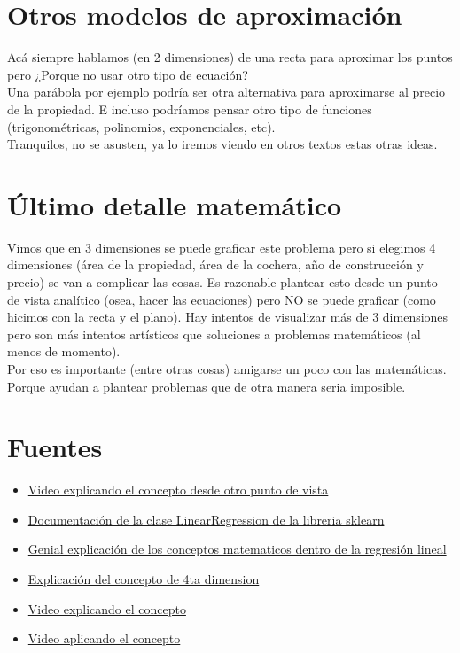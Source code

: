 \documentclass{article}
\begin{document}
\section{Otros modelos de aproximación}
Acá siempre hablamos (en 2 dimensiones) de una recta para aproximar los puntos pero ¿Porque no usar otro tipo de ecuación?\\
Una parábola por ejemplo podría ser otra alternativa para aproximarse al precio de la propiedad. E incluso podríamos pensar otro tipo de funciones (trigonométricas, polinomios, exponenciales, etc).\\
Tranquilos, no se asusten, ya lo iremos viendo en otros textos estas otras ideas.

\section{Último detalle matemático}
Vimos que en 3 dimensiones se puede graficar este problema pero si elegimos 4 dimensiones (área de la propiedad, área de la cochera, año de construcción y precio) se van a complicar las cosas.  Es razonable plantear esto desde un punto de vista analítico (osea, hacer las ecuaciones) pero NO se puede graficar (como hicimos con la recta y el plano). Hay intentos de visualizar más de 3 dimensiones pero son más intentos artísticos que soluciones a problemas matemáticos (al menos de momento).\\
Por eso es importante (entre otras cosas) amigarse un poco con las matemáticas. Porque ayudan a plantear problemas que de otra manera seria imposible.

\section{Fuentes}
\begin{itemize}
    \item \href{https://www.youtube.com/watch?v=k964_uNn3l0}{Video explicando el concepto desde otro punto de vista}
    \item \href{https://scikit-learn.org/stable/modules/generated/sklearn.linear_model.LinearRegression.html}{Documentación de la clase LinearRegression de la libreria sklearn}
    \item \href{https://www.youtube.com/watch?v=3g-e2aiRfbU}{Genial explicación de los conceptos matematicos dentro de la regresión lineal}
    \item \href{https://www.youtube.com/watch?v=3O0DV40B0rs}{Explicación del concepto de 4ta dimension}
    \item \href{https://www.youtube.com/watch?v=MFXKcEeT-M0&list=PLJjOveEiVE4Cbbx1dVjydfmPPpjl0pg86&index=5}{Video explicando el concepto}
    \item \href{https://www.youtube.com/watch?v=YLGhVBB5rGU}{Video aplicando el concepto}
\end{itemize}
\end{document}
